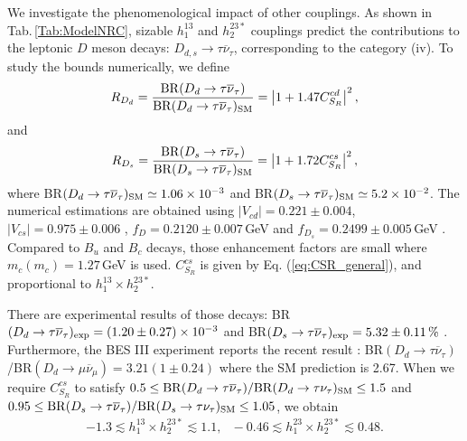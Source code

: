 \documentclass[12pt, a4paper]{article}
\numberwithin{equation}{section} %
\newcommand{\ov}{\overline}
\newcommand{\1}{\mbox{1}\hspace{-0.25em}\mbox{l}}
\begin{document}
We investigate the phenomenological impact of other couplings.
As shown in Tab.\,\ref{Tab:ModelNRC}, sizable $h_1^{13}$ and $h_2^{23*}$ couplings
predict the contributions to the leptonic $D$ meson decays: $D_{d,s}\to\tau\ov\nu_\tau$, corresponding to the category (iv).
To study the bounds numerically, we define
\begin{align}
R_{D_d}=\frac{{\rm{BR}}(D_d\to \tau\ov\nu_\tau)}{{\rm{BR}}(D_d\to \tau\ov\nu_\tau)_{\rm SM}} =\left| 1 + 1.47 C^{cd}_{S_R} \right|^2 ,
\label{eq:D}
\end{align}
and
\begin{align}
 \label{eq:Ds}
R_{D_s}=\frac{{\rm{BR}}(D_s\to \tau\ov\nu_\tau)} {{\rm{BR}}(D_s\to \tau\ov\nu_\tau)_{\rm SM}}=\left| 1 + 1.72  C_{S_R}^{cs} \right|^2,
\end{align}
where BR$(D_d\to \tau\ov\nu_\tau)_{\rm SM}\simeq1.06 \times 10^{-3}$ and BR$(D_s\to \tau\ov\nu_\tau)_{\rm SM} \simeq 5.2 \times 10^{-2}$. The numerical estimations are obtained using $|V_{cd}|=0.221\pm0.004$, $|V_{cs}|=0.975\pm0.006$ \cite{PDG2022}, $f_{D}=0.2120\pm0.007$\,GeV and  $f_{D_s}=0.2499\pm0.005$\,GeV \cite{HFLAV:2022pwe}.
Compared to $B_u$ and $B_c$ decays, those enhancement factors are small where $m_c(m_c)=1.27$\,GeV is used. $C_{S_R}^{cs}$ is given by Eq. (\ref{eq:CSR_general}),
and proportional to $h_1^{13}\times h_2^{23*}$.

There are experimental results of those decays: BR$(D_d\to \tau\ov\nu_\tau)_{\rm exp}=(1.20\pm0.27)\times 10^{-3}$ and  BR$(D_s\to \tau\ov\nu_\tau)_{\rm exp}=5.32\pm0.11\,\%$ \cite{PDG2022}.
Furthermore, the BES III experiment reports the recent result \cite{BESIII:2019vhn}: BR$(D_d\to\tau\ov\nu_\tau)$/BR$(D_d\to\mu\ov\nu_\mu)=3.21(1\pm0.24)$ where the SM prediction is 2.67. 
When we require $C_{S_R}^{cs}$ to satisfy $0.5\le {\rm{BR}}(D_d\to \tau\ov\nu_\tau)/{\rm{BR}}(D_d\to \tau\nu_\tau)_{\rm{SM}}\le1.5$ and $0.95\le{\rm{BR}}(D_s\to \tau\ov\nu_\tau)/{\rm{BR}}(D_s\to \tau\nu_\tau)_{\rm{SM}}\le1.05$, we obtain 
\begin{align}
   -1.3 \lesssim h_1^{13}\times h_2^{23*}\lesssim 1.1,~~~ 
   -0.46 \lesssim h_1^{23}\times h_2^{23*}\lesssim 0.48.
\end{align}
\end{document}
